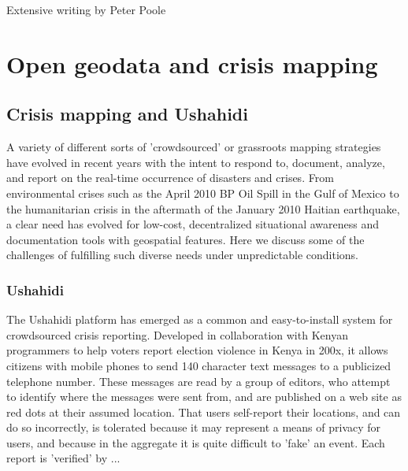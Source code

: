 \documentclass[11pt]{report}
\begin{document}
Extensive writing by Peter Poole \cite{poole2006there}


\section{Open geodata and crisis mapping}
\subsection{Crisis mapping and Ushahidi}

A variety of different sorts of 'crowdsourced' or grassroots mapping strategies have evolved in recent years with the intent to respond to, document, analyze, and report on the real-time occurrence of disasters and crises. From environmental crises such as the April 2010 BP Oil Spill in the Gulf of Mexico to the humanitarian crisis in the aftermath of the January 2010 Haitian earthquake, a clear need has evolved for low-cost, decentralized situational awareness and documentation tools with geospatial features. Here we discuss some of the challenges of fulfilling such diverse needs under unpredictable conditions.

\subsubsection{Ushahidi}

The Ushahidi platform has emerged as a common and easy-to-install system for crowdsourced crisis reporting. Developed in collaboration with Kenyan programmers to help voters report election violence in Kenya in 200x, it allows citizens with mobile phones to send 140 character text messages to a publicized telephone number.\cite{okolloh2009ushahidi} These messages are read by a group of editors, who attempt to identify where the messages were sent from, and are published on a web site as red dots at their assumed location. That users self-report their locations, and can do so incorrectly, is tolerated because it may represent a means of privacy for users, and because in the aggregate it is quite difficult to 'fake' an event. Each report is 'verified' by ... 

\end{document}
